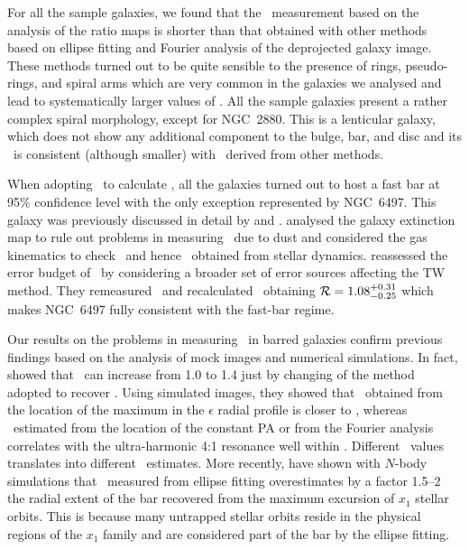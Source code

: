 \documentclass{aa}
\begin{document}
For all the sample galaxies, we found that the \rbar\ measurement based on the analysis of the ratio maps is shorter than that obtained with other methods based on ellipse fitting and Fourier analysis of the deprojected galaxy image. These methods turned out to be quite sensible to the presence of rings, pseudo-rings, and spiral arms which are very common in the galaxies we analysed and lead to systematically larger values of \rbar. All the sample galaxies present a rather complex spiral morphology, except for NGC~2880. This is a lenticular galaxy, which does not show any additional component to the bulge, bar, and disc and its \rqb\ is consistent (although smaller) with \rbar\ derived from other methods.

When adopting \rqb\ to calculate \rr, all the galaxies turned out to host a fast bar at 95\% confidence level with the only exception represented by NGC~6497. This galaxy was previously discussed in detail by \citet{Aguerri2015} and \citet{Garma-Oehmichen2020}. \citet{Aguerri2015} analysed the galaxy extinction map to rule out problems in measuring \rbar\ due to dust and considered the gas kinematics to check \vcirc\ and hence \rcor\ obtained from stellar dynamics. \citet{Garma-Oehmichen2020} reassessed the error budget of \omegabar\ by considering a broader set of error sources affecting the TW method. They remeasured \omegabar\ and recalculated \rcor\ obtaining ${\cal R}=1.08^{+0.31}_{-0.25}$ which makes NGC~6497 fully consistent with the fast-bar regime.

Our results on the problems in measuring \rbar\ in barred galaxies confirm previous findings based on the analysis of mock images and numerical simulations. In fact, \cite{MichelDansac2006} showed that \rr\ can increase from 1.0 to 1.4 just by changing of the method adopted to recover \rbar. Using simulated images, they showed that \rbar\ obtained from the location of the maximum in the $\epsilon$ radial profile is closer to \rcor, whereas \rbar\ estimated from the location of the constant PA or from the Fourier analysis correlates with the ultra-harmonic 4:1 resonance well within \rcor. Different \rbar\ values translates into different \rr\ estimates. More recently, \cite{Petersen2019} have shown with $N$-body simulations that \rbar\ measured from ellipse fitting overestimates by a factor 1.5--2 the radial extent of the bar recovered from the maximum excursion of $x_1$ stellar orbits. This is because many untrapped stellar orbits reside in the physical regions of the $x_1$ family and are considered part of the bar by the ellipse fitting. 
\end{document}
